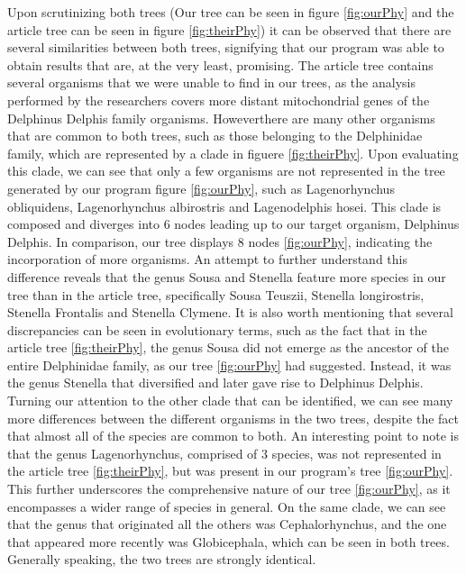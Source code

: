 \documentclass[12pt]{article}
\begin{document}
Upon scrutinizing both trees (Our tree can be seen in figure \ref{fig:ourPhy} and the article tree can be seen in figure \ref{fig:theirPhy}) it can be observed that there are several similarities between both trees, signifying that our program was able to obtain results that are, at the very least, promising. The article tree contains several organisms that we were unable to find in our trees, as the analysis performed by the researchers covers more distant mitochondrial genes of the Delphinus Delphis family organisms. Howeverthere are many other organisms that are common to both trees, such as those belonging to the Delphinidae family, which are represented by a clade in figuere \ref{fig:theirPhy}. Upon evaluating this clade, we can see that only a few organisms are not represented in the tree generated by our program figure \ref{fig:ourPhy}, such as Lagenorhynchus obliquidens, Lagenorhynchus albirostris and Lagenodelphis hosei. This clade is composed and diverges into 6 nodes leading up to our target organism, Delphinus Delphis. In comparison, our tree displays 8 nodes \ref{fig:ourPhy}, indicating the incorporation of more organisms. An attempt to further understand this difference reveals that the genus Sousa and Stenella feature more species in our tree than in the article tree, specifically Sousa Teuszii, Stenella longirostris, Stenella Frontalis and Stenella Clymene.\newline
It is also worth mentioning that several discrepancies can be seen in evolutionary terms, such as the fact that in the article tree \ref{fig:theirPhy}, the genus Sousa did not emerge as the ancestor of the entire Delphinidae family, as our tree \ref{fig:ourPhy} had suggested. Instead, it was the genus Stenella that diversified and later gave rise to Delphinus Delphis.\newline
Turning our attention to the other clade that can be identified, we can see many more differences between the different organisms in the two trees, despite the fact that almost all of the species are common to both. An interesting point to note is that the genus Lagenorhynchus, comprised of 3 species, was not represented in the article tree \ref{fig:theirPhy}, but was present in our program's tree \ref{fig:ourPhy}. This further underscores the comprehensive nature of our tree \ref{fig:ourPhy}, as it encompasses a wider range of species in general.\newline
On the same clade, we can see that the genus that originated all the others was Cephalorhynchus, and the one that appeared more recently was Globicephala, which can be seen in both trees. Generally speaking, the two trees are strongly identical. \newline
\end{document}

